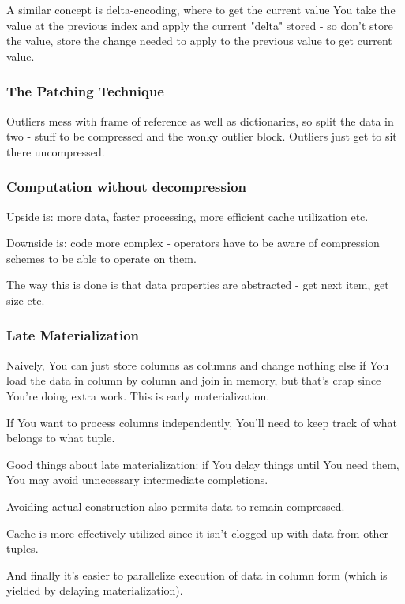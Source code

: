 \documentclass{article}
\begin{document}
			A similar concept is delta-encoding, where to get the current value You take the value at the previous index and apply the current "delta" stored - so don't store the value, store the change needed to apply to the previous value to get current value.
			
		\subsubsection{The Patching Technique}
		
			Outliers mess with frame of reference as well as dictionaries, so split the data in two - stuff to be compressed and the wonky outlier block. Outliers just get to sit there uncompressed.
	
		\subsubsection{Computation without decompression}
			
			Upside is: more data, faster processing, more efficient cache utilization etc.
			
			Downside is: code more complex - operators have to be aware of compression schemes to be able to operate on them.
			
			The way this is done is that data properties are abstracted - get next item, get size etc.
			
		\subsubsection{Late Materialization}
		
			Naively, You can just store columns as columns and change nothing else if You load the data in column by column and join in memory, but that's crap since You're doing extra work. This is early materialization.
			
			If You want to process columns independently, You'll need to keep track of what belongs to what tuple.
			
			Good things about late materialization: if You delay things until You need them, You may avoid unnecessary intermediate completions. 
			
			Avoiding actual construction also permits data to remain compressed.
			
			Cache is more effectively utilized since it isn't clogged up with data from other tuples.
			
			And finally it's easier to parallelize execution of data in column form (which is yielded by delaying materialization).
			
\end{document}
